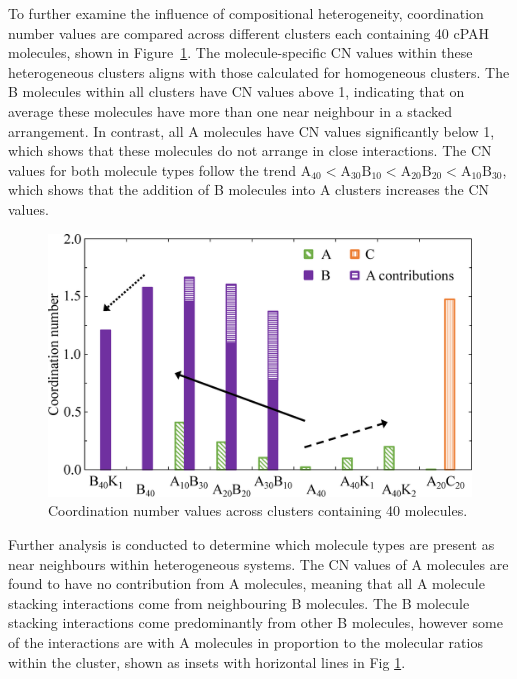 To further examine the influence of compositional heterogeneity, coordination number values are compared across different clusters each containing 40 cPAH molecules, shown in Figure~\ref{fig:coordination_numbers}. The molecule-specific CN values within these heterogeneous clusters aligns with those calculated for homogeneous clusters. The B molecules within all clusters have CN values above 1, indicating that on average these molecules have more than one near neighbour in a stacked arrangement. In contrast, all A molecules have CN values significantly below 1, which shows that these molecules do not arrange in close interactions.  
The CN values for both molecule types follow the trend $\text{A}_{\text{40}} < \text{A}_{\text{30}}\text{B}_{\text{10}} < \text{A}_{\text{20}}\text{B}_{\text{20}} < \text{A}_{\text{10}}\text{B}_{\text{30}}$, which shows that the addition of B molecules into A clusters increases the CN values.
%
\begin{figure}[!bth]
\centering
\includegraphics[width=0.8\linewidth]{Figures/CN_bar_chart_updated.eps}
\caption{Coordination number values across clusters containing 40 molecules.}
\label{fig:coordination_numbers}
\end{figure}
%

Further analysis is conducted to determine which molecule types are present as near neighbours within heterogeneous systems. The CN values of A molecules are found to have no contribution from A molecules, meaning that all A molecule stacking interactions come from neighbouring B molecules. The B molecule stacking interactions come predominantly from other B molecules, however some of the interactions are with A molecules in proportion to the molecular ratios within the cluster, shown as insets with horizontal lines in Fig \ref{fig:coordination_numbers}.
%

